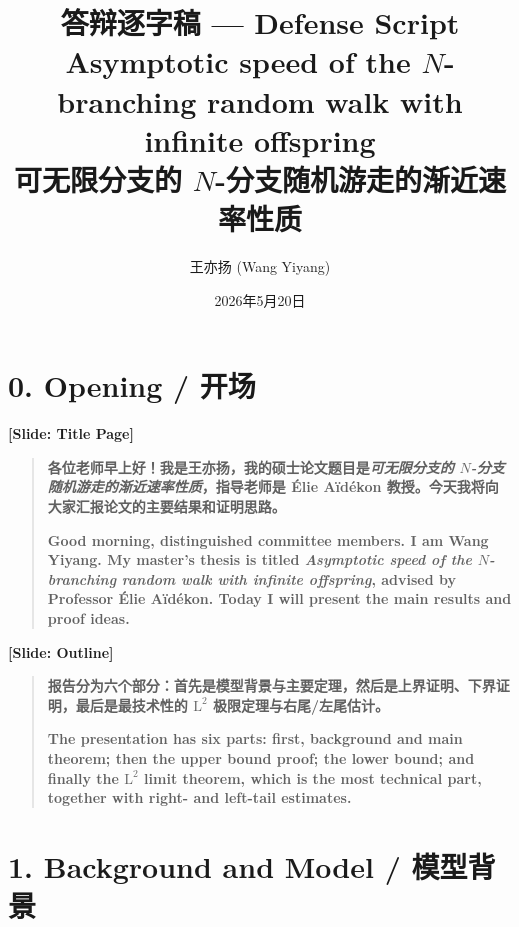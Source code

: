 \documentclass[12pt,a4paper]{article}
\title{答辩逐字稿 --- Defense Script\\
\large Asymptotic speed of the $N$-branching random walk with infinite offspring\\
\large 可无限分支的 $N$-分支随机游走的渐近速率性质}
\author{王亦扬 (Wang Yiyang)}
\date{2026年5月20日}
\begin{document}
\maketitle

\section*{0. Opening / 开场}

\begin{center}
\color{blue!60!black}\textbf{[Slide: Title Page]}
\end{center}

\begin{quote}
\textbf{各位老师早上好！我是王亦扬，我的硕士论文题目是\emph{可无限分支的 $N$-分支随机游走的渐近速率性质}，指导老师是 \'{E}lie A\"id\'ekon 教授。今天我将向大家汇报论文的主要结果和证明思路。}

\bigskip

\textbf{Good morning, distinguished committee members. I am Wang Yiyang. My master's thesis is titled \emph{Asymptotic speed of the $N$-branching random walk with infinite offspring}, advised by Professor \'{E}lie A\"id\'ekon. Today I will present the main results and proof ideas.}
\end{quote}

\medskip

\begin{center}
\color{blue!60!black}\textbf{[Slide: Outline]}
\end{center}

\begin{quote}
\textbf{报告分为六个部分：首先是模型背景与主要定理，然后是上界证明、下界证明，最后是最技术性的 $\mathrm{L}^2$ 极限定理与右尾/左尾估计。}

\bigskip

\textbf{The presentation has six parts: first, background and main theorem; then the upper bound proof; the lower bound; and finally the $\mathrm{L}^2$ limit theorem, which is the most technical part, together with right- and left-tail estimates.}
\end{quote}

\section*{1. Background and Model / 模型背景}
\end{document}
